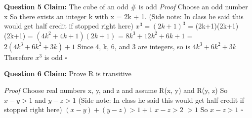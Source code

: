 \documentclass{article}
\begin{document}
\textbf{Question 5}\newline
\textbf{Claim: } The cube of an odd \# is odd\newline\newline
\textit{Proof}\newline
Choose an odd number x\newline
So there exists an integer k with x = 2k + 1. (Side note: In class he said this would get half credit if stopped right here)\newline
${x^3 = (2k+1)^3}$\newline
= (2k+1)(2k+1)(2k+1)\newline
= ${(4k^2 + 4k + 1)(2k+1)}$\newline
= ${8k^3 + 12k^2 + 6k + 1}$\newline
= ${2(4k^3 + 6k^2 + 3k) + 1}$\newline
Since 4, k, 6, and 3 are integers, so is ${4k^3 + 6k^2 + 3k}$\newline
Therefore ${x^3}$ is odd $\square$\newline\newline

\textbf{Question 6}\newline
\textbf{Claim: } Prove R is transitive\newline\newline

\textit{Proof}\newline
Choose real numbers x, y, and z and assume R(x, y) and R(y, z)\newline
So ${x-y>1}$ and ${y-z>1}$ (Side note: In class he said this would get half credit if stopped right here)\newline
${(x-y)+(y-z) > 1 + 1}$\newline
${x-z > 2}$\newline
${> 1}$\newline
So ${x-z>1}$ $\square$\newline\newline


\enddocument
\end{document}
